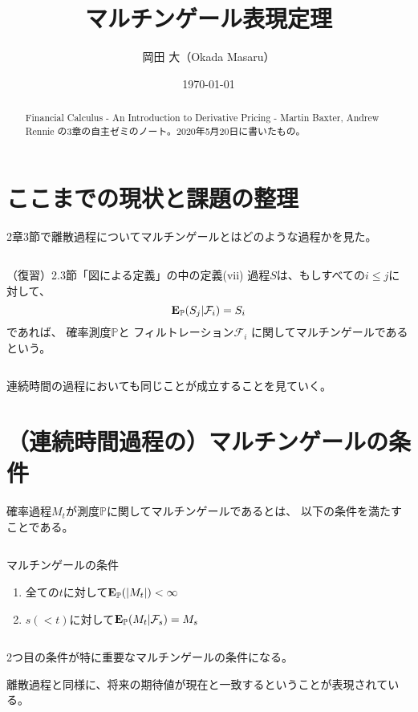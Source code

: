 \documentclass[uplatex,a4j,12pt,dvipdfmx]{jsarticle}
\title{
マルチンゲール表現定理
}
\author{岡田 大（Okada Masaru）}
\date{ \today }
\begin{document}
\maketitle
\begin{abstract}
	Financial Calculus - An Introduction to Derivative Pricing - Martin Baxter, Andrew Rennie の3章の自主ゼミのノート。2020年5月20日に書いたもの。
\end{abstract}

\section{ここまでの現状と課題の整理}

2章3節で離散過程についてマルチンゲールとはどのような過程かを見た。

${}$

%
\begin{itembox}[l]{（復習）2.3節「図による定義」の中の定義(vii)}
	過程$S$は、もしすべての$i \leq j$に対して、
	$$
		{\bf E}_{\mathbb{P}}( S_{j} | \mathcal{F}_{i} ) = S_{i}
	$$
	であれば、
	確率測度$\mathbb{P}$と
	フィルトレーション$\mathcal{F}_{i}$
	に関してマルチンゲールであるという。
\end{itembox}
%

${}$

連続時間の過程においても同じことが成立することを見ていく。
\section{（連続時間過程の）マルチンゲールの条件}

確率過程$M_{t}$が測度$\mathbb{P}$に関してマルチンゲールであるとは、
以下の条件を満たすことである。

${}$

%
\begin{itembox}[l]{マルチンゲールの条件}
	\begin{enumerate}
		\item 全ての$t$に対して${\bf E}_{\mathbb{P}}( | M_{t} | ) < \infty$
		\item $s(<t)$に対して${\bf E}_{\mathbb{P}}( M_{t} | \mathcal{F}_{s} ) = M_{s}$
	\end{enumerate}
\end{itembox}
%

${}$

2つ目の条件が特に重要なマルチンゲールの条件になる。

離散過程と同様に、将来の期待値が現在と一致するということが表現されている。
\end{document}
